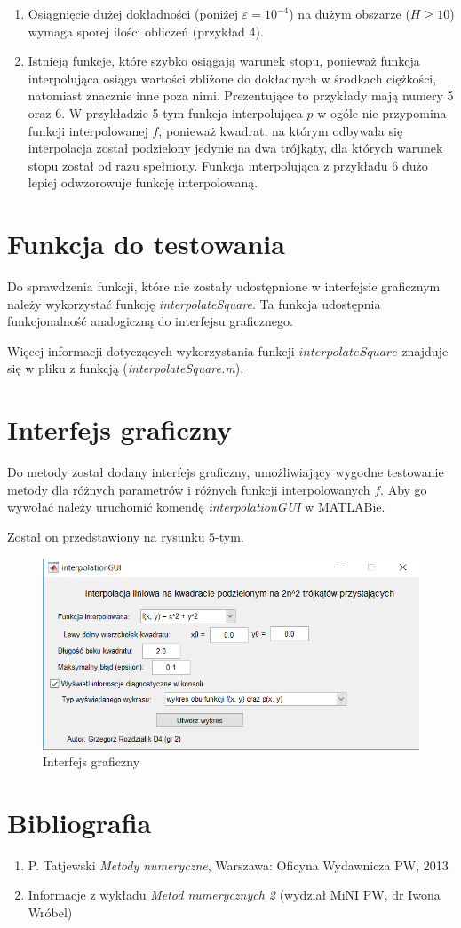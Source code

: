 \documentclass[12pt]{article}
\begin{document}
\begin{enumerate}
		\item Osiągnięcie dużej dokładności (poniżej $\varepsilon = 10^{-4}$) na dużym obszarze ($H \geq 10$) wymaga sporej ilości obliczeń (przykład 4).
		
		\item Istnieją funkcje, które szybko osiągają warunek stopu, ponieważ funkcja interpolująca osiąga wartości zbliżone do dokładnych w środkach ciężkości, natomiast znacznie inne poza nimi. Prezentujące to przykłady mają numery 5 oraz 6. W przykładzie 5-tym funkcja interpolująca $p$ w ogóle nie przypomina funkcji interpolowanej $f$, ponieważ kwadrat, na którym odbywała się interpolacja został podzielony jedynie na dwa trójkąty, dla których warunek stopu został od razu spełniony. Funkcja interpolująca z przykładu 6 dużo lepiej odwzorowuje funkcję interpolowaną.
	\end{enumerate}

	\pagebreak
	
	\section{Funkcja do testowania}
	Do sprawdzenia funkcji, które nie zostały udostępnione w interfejsie graficznym należy wykorzystać funkcję \textit{interpolateSquare}. Ta funkcja udostępnia funkcjonalność analogiczną do interfejsu graficznego.
	
	Więcej informacji dotyczących wykorzystania funkcji $interpolateSquare$ znajduje się w pliku z funkcją (\textit{interpolateSquare.m}).
	
	\section{Interfejs graficzny}
	Do metody został dodany interfejs graficzny, umożliwiający wygodne testowanie metody dla różnych parametrów i różnych funkcji interpolowanych $f$. Aby go wywołać należy uruchomić komendę \textit{interpolationGUI} w MATLABie.
	
	Został on przedstawiony na rysunku 5-tym.
	
	\begin{figure}
		\centering
		\includegraphics[scale=1]{images/gui.png}
		\caption{Interfejs graficzny}
	\end{figure}
	
	\section{Bibliografia}
	\begin{enumerate}
		\item P. Tatjewski \textit{Metody numeryczne}, Warszawa: Oficyna Wydawnicza PW, 2013
		\item Informacje z wykładu \textit{Metod numerycznych 2} (wydział MiNI PW, dr Iwona Wróbel)
	\end{enumerate}
	
\end{document}

